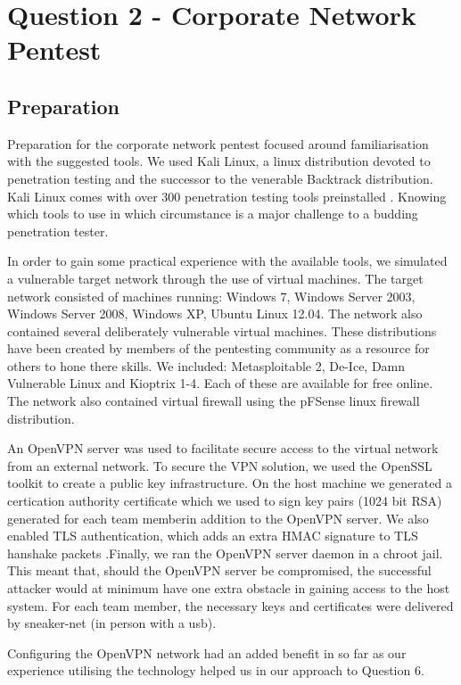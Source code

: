 \chapter{Question 2 - Corporate Network Pentest}

\section{Preparation}
Preparation for the corporate network pentest focused around familiarisation with the suggested tools. We used Kali Linux, a linux distribution devoted to penetration testing and the successor to the venerable Backtrack distribution. Kali Linux comes with over 300 penetration testing tools preinstalled \cite{kali} . Knowing which tools to use in which circumstance is a major challenge to a budding penetration tester.

In order to gain some practical experience with the available tools, we simulated a vulnerable target network 
through the use of virtual machines. The target network consisted of machines running: Windows 7, Windows Server 2003, Windows Server 2008, Windows XP, Ubuntu Linux 12.04. The network also contained several deliberately vulnerable virtual machines. These distributions have been created by members of the pentesting community as a resource for others to hone there skills. We included: Metasploitable 2, De-Ice, Damn Vulnerable Linux and Kioptrix 1-4. Each of these are available for free online. The network also contained virtual firewall using the pFSense linux firewall distribution.

An OpenVPN server was used to facilitate secure access to the virtual network from an external network. To secure the VPN solution, we used the OpenSSL toolkit to create a public key infrastructure. On the host machine we generated a certication authority certificate which we used to sign key pairs (1024 bit RSA) generated for each team memberin addition to the OpenVPN server. We also enabled TLS authentication, which adds an extra HMAC signature to TLS hanshake packets \cite{openvpn}.Finally, we ran the OpenVPN server daemon in a chroot jail. This meant that, should the OpenVPN server be compromised, the successful attacker would at minimum have one extra obstacle in gaining access to the host system. For each team member, the necessary keys and certificates were delivered by sneaker-net (in person with a usb). 

Configuring the OpenVPN network had an added benefit in so far as our experience utilising the technology helped us in our approach to Question 6. 
